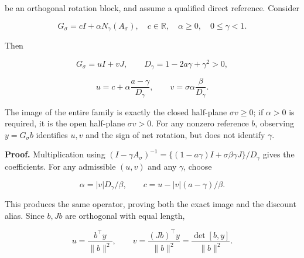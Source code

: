 \documentclass[11pt,a4paper]{article}
\begin{document}
\par
\noindent\begin{minipage}{\linewidth}

be an orthogonal rotation block, and assume a qualified direct
reference. Consider

\[
G_\sigma=cI+\alpha N_\gamma(A_\sigma),
\quad c\in\mathbb R,\quad\alpha\ge0,\quad0\le\gamma<1.
\]

\end{minipage}\par

\par
\noindent\begin{minipage}{\linewidth}

Then

\[
G_\sigma=uI+vJ,\qquad D_\gamma=1-2a\gamma+\gamma^2>0,
\]

\end{minipage}\par

\[
u=c+\alpha\frac{a-\gamma}{D_\gamma},
\qquad v=\sigma\alpha\frac{\beta}{D_\gamma}.
\]

The image of the entire family is exactly the closed half-plane
\(\sigma v\ge0\); if \(\alpha>0\) is required, it is the open half-plane
\(\sigma v>0\). For any nonzero reference \(b\), observing
\(y=G_\sigma b\) identifies \(u,v\) and the sign of net rotation, but
does not identify \(\gamma\).

\par
\noindent\begin{minipage}{\linewidth}

\textbf{Proof.} Multiplication using
\((I-\gamma A_\sigma)^{-1}=\{(1-a\gamma)I+\sigma\beta\gamma J\}/D_\gamma\)
gives the coefficients. For any admissible \((u,v)\) and any \(\gamma\),
choose

\[
\alpha=|v|D_\gamma/\beta,\qquad
c=u-|v|(a-\gamma)/\beta.
\]

\end{minipage}\par

\par
\noindent\begin{minipage}{\linewidth}

This produces the same operator, proving both the exact image and the
discount alias. Since \(b,Jb\) are orthogonal with equal length,

\[
u=\frac{b^\top y}{\|b\|^2},\qquad
v=\frac{(Jb)^\top y}{\|b\|^2}
=\frac{\det[b,y]}{\|b\|^2}.
\]

\end{minipage}\par
\end{document}
